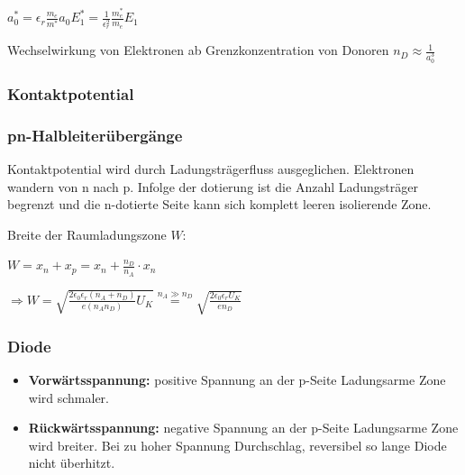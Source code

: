 \documentclass[10pt,a4paper]{scrartcl}
\begin{document}
\begin{multicols*}{3}
	$a_0^\ast = \epsilon_r\frac{m_e}{m^\ast}a_0$\hfill$E_1^\ast=\frac{1}{\epsilon_r^2}\frac{m_e^\ast}{m_e}E_1$
	
	Wechselwirkung von Elektronen ab Grenzkonzentration von Donoren $n_D\approx \frac{1}{a_0^3}$
	
		
	\subsubsection{Kontaktpotential}
	
	
	
	
	
	\subsubsection{pn-Halbleiterübergänge}
	
	
	
	Kontaktpotential wird durch Ladungsträgerfluss ausgeglichen. Elektronen wandern von n nach p. Infolge der dotierung ist die Anzahl Ladungsträger begrenzt und die n-dotierte Seite kann sich komplett leeren \dahe isolierende Zone.
	
	
	
	Breite der Raumladungszone $W$:
	
	$W=x_n+x_p=x_n+\frac{n_D}{n_A}\cdot x_n$
	
	$\Rightarrow W=\sqrt{\frac{2\epsilon_0\epsilon_r(n_A+n_D)}{e(n_An_D)}U_K}\overset{n_A\gg n_D}{=}\sqrt{\frac{2\epsilon_0\epsilon_rU_K}{e n_D}}$
	
	\subsubsection{Diode}
	
	
	\begin{itemize}
	\compaq
	\item \textbf{Vorwärtsspannung:} positive Spannung an der p-Seite \dahe Ladungsarme Zone wird schmaler.
	\item \textbf{Rückwärtsspannung:} negative Spannung an der p-Seite \dahe Ladungsarme Zone wird breiter. Bei zu hoher Spannung \dahe Durchschlag, reversibel so lange Diode nicht überhitzt.
	\end{itemize}
	

\end{multicols*}
\end{document}
